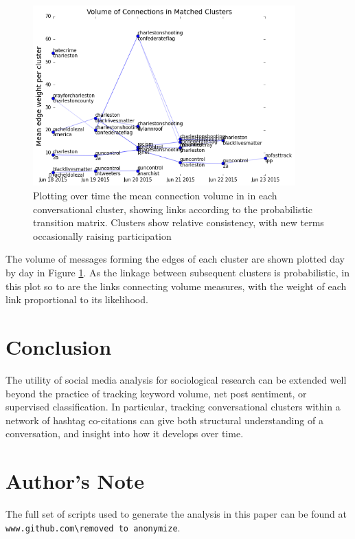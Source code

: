 \documentclass[12pt]{article}
\begin{document}
\begin{figure}[!ht]
  \centering
    \includegraphics[width=0.9\textwidth]{F8_Matched_cluster_timeseries.png}
    \caption{Plotting over time the mean connection volume in in each conversational cluster,  showing links according to the probabilistic transition matrix. Clusters show relative consistency, with new terms occasionally raising participation}
  \label{fig:cluster_volume_graphs}
\end{figure}

The volume of messages forming the edges of each cluster are shown plotted day by day in Figure \ref{fig:cluster_volume_graphs}. As the linkage between subsequent clusters is probabilistic, in this plot so to are the links connecting volume measures, with the weight of each link proportional to its likelihood.

\section{Conclusion}
The utility of social media analysis for sociological research can be extended well beyond the practice of tracking keyword volume, net post sentiment, or supervised classification. In particular, tracking conversational clusters within a network of hashtag co-citations can give both structural understanding of a conversation, and insight into how it develops over time.

\section{Author's Note}
The full set of scripts used to generate the analysis in this paper can be found at \verb|www.github.com\removed to anonymize|.



{}
\end{document}
